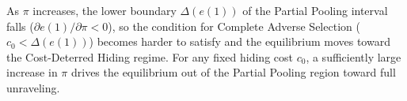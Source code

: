 \label{prop:pi}
As $\pi$ increases, the lower boundary $\Delta(e(1))$ of the Partial Pooling interval falls ($\partial e(1)/\partial\pi < 0$), so the condition for Complete Adverse Selection ($c_0 < \Delta(e(1))$) becomes harder to satisfy and the equilibrium moves toward the Cost-Deterred Hiding regime. For any fixed hiding cost $c_0$, a sufficiently large increase in $\pi$ drives the equilibrium out of the Partial Pooling region toward full unraveling.
